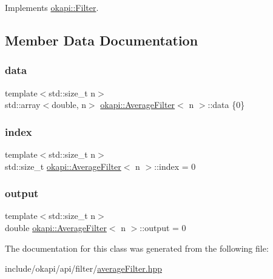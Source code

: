 Implements \mbox{\hyperlink{classokapi_1_1Filter_a3469cd4bc108f8accf300d9f5cc9f42f}{okapi\+::\+Filter}}.



\subsection{Member Data Documentation}
\mbox{\label{classokapi_1_1AverageFilter_a1aeb97bb7bda056a072281c974b074be}} 
\subsubsection{\texorpdfstring{data}{data}}
{\footnotesize\ttfamily template$<$std\+::size\+\_\+t n$>$ \\
std\+::array$<$double, n$>$ \mbox{\hyperlink{classokapi_1_1AverageFilter}{okapi\+::\+Average\+Filter}}$<$ n $>$\+::data \{0\}\hspace{0.3cm}{\ttfamily [protected]}}

\mbox{\label{classokapi_1_1AverageFilter_ab551add0adf7ec09120e73e3f83af411}} 
\subsubsection{\texorpdfstring{index}{index}}
{\footnotesize\ttfamily template$<$std\+::size\+\_\+t n$>$ \\
std\+::size\+\_\+t \mbox{\hyperlink{classokapi_1_1AverageFilter}{okapi\+::\+Average\+Filter}}$<$ n $>$\+::index = 0\hspace{0.3cm}{\ttfamily [protected]}}

\mbox{\label{classokapi_1_1AverageFilter_ad01d62f539475ad62ca73bb92aa3968d}} 
\subsubsection{\texorpdfstring{output}{output}}
{\footnotesize\ttfamily template$<$std\+::size\+\_\+t n$>$ \\
double \mbox{\hyperlink{classokapi_1_1AverageFilter}{okapi\+::\+Average\+Filter}}$<$ n $>$\+::output = 0\hspace{0.3cm}{\ttfamily [protected]}}



The documentation for this class was generated from the following file\+:\begin{DoxyCompactItemize}
\item 
include/okapi/api/filter/\mbox{\hyperlink{averageFilter_8hpp}{average\+Filter.\+hpp}}\end{DoxyCompactItemize}
